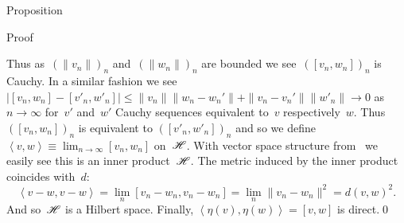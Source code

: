 \documentclass[b]{subfiles}
\begin{document}
\begin{parsec}
\begin{point}{Proposition}
\begin{point}{Proof}
\begin{point}
Thus as~$(\|v_n\|)_n$ and~$(\|w_n\|)_n$ are bounded
we see~$([v_n,w_n])_n$ is Cauchy.
In a similar fashion we see~$\bigl|[v_n,w_n] - [v'_n,w'_n]\bigr|
    \leq \|v_n\| \|w_n - w_n'\| + \|v_n-v_n'\|\|w'_n\|\to 0$ as~$n\to \infty$
    for~$v'$ and~$w'$ Cauchy sequences equivalent
to~$v$ respectively~$w$.
Thus
$([v_n,w_n])_n$ is equivalent to
$([v'_n,w'_n])_n$
    and so
    we define~$\left<v,w\right>
        \equiv \lim_{n\to \infty} [v_n,w_n]$ on~$\mathscr{H}$.
With vector space structure from~
we easily see this is an inner product~$\mathscr{H}$.
The metric induced by the inner product coincides with~$d$:
\begin{equation*}
    \left<v-w,v-w\right>
   =\lim_{n}[v_n-w_n,v_n-w_n]
    =\lim_{n}\|v_n-w_n\|^2
    = d(v,w)^2.
\end{equation*}
And so~$\mathscr{H}$ is a Hilbert space.
Finally, $\left<\eta(v),\eta(w)\right>=[v,w]$ is direct.\qed
\end{point}
\end{point}
\end{point}
\end{parsec}
\end{document}
